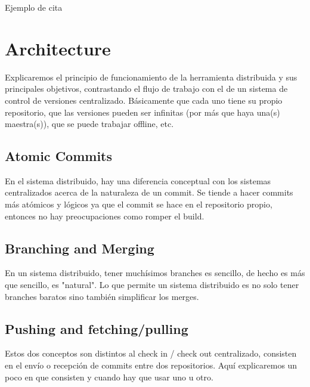 \documentclass[%
	final,
	notitlepage,
	narroweqnarray,
	inline,
	twoside,
	]{ieee}
\begin{document}
Ejemplo de cita \cite{linusgit} 


\section{Architecture}

Explicaremos el principio de funcionamiento de la herramienta distribuida 
y sus principales objetivos, contrastando el flujo de trabajo con el de un 
sistema de control de versiones centralizado. Básicamente que cada uno tiene 
su propio repositorio, que las versiones pueden ser infinitas (por más que 
haya una(s) maestra(s)), que se puede trabajar offline, etc.

\subsection{Atomic Commits}

En el sistema distribuido, hay una diferencia conceptual con los sistemas 
centralizados acerca de la naturaleza de un commit. Se tiende a hacer commits
más atómicos y lógicos ya que el commit se hace en el repositorio propio, 
entonces no hay preocupaciones como romper el build.

\subsection{Branching and Merging}

En un sistema distribuido, tener muchísimos branches es sencillo, de hecho 
es más que sencillo, es "natural". Lo que permite un sistema distribuido es 
no solo tener branches baratos sino también simplificar los merges. 

\subsection{Pushing and fetching/pulling}

Estos dos conceptos son distintos al check in / check out centralizado, 
consisten en el envío o recepción de commits entre dos repositorios. Aquí 
explicaremos un poco en que consisten y cuando hay que usar uno u otro.

\end{document}
